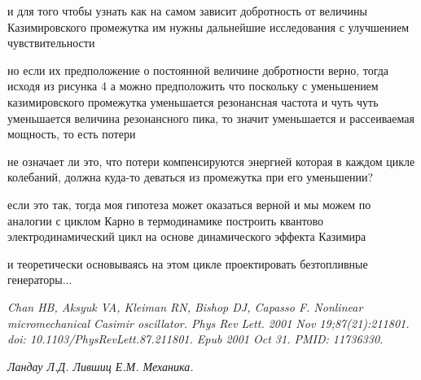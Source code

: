 \documentclass[12pt, letterpaper]{article}
\begin{document}
и для того чтобы узнать как на самом зависит добротность от величины Казимировского промежутка им нужны дальнейшие исследования с улучшением чувствительности

но если их предположение о постоянной величине добротности верно, тогда исходя из рисунка 4 а можно предположить что поскольку с уменьшением казимировского промежутка уменьшается резонансная частота и чуть чуть уменьшается величина резонансного пика, то значит уменьшается и рассеиваемая мощность, то есть потери

не означает ли это, что потери компенсируются энергией которая в каждом цикле колебаний, должна куда-то деваться из промежутка при его уменьшении?

если это так, тогда моя гипотеза может оказаться верной и мы можем по аналогии с циклом Карно в термодинамике построить квантово электродинамический цикл на основе динамического эффекта Казимира

и теоретически основываясь на этом цикле проектировать безтопливные генераторы...


\begin{thebibliography}{99}


\textit{Chan HB, Aksyuk VA, Kleiman RN, Bishop DJ, Capasso F. Nonlinear micromechanical Casimir oscillator. Phys Rev Lett. 2001 Nov 19;87(21):211801. doi: 10.1103/PhysRevLett.87.211801. Epub 2001 Oct 31. PMID: 11736330.}

\textit{Ландау Л.Д. Лившиц Е.М. Механика.}

\end{thebibliography}
\end{document}
